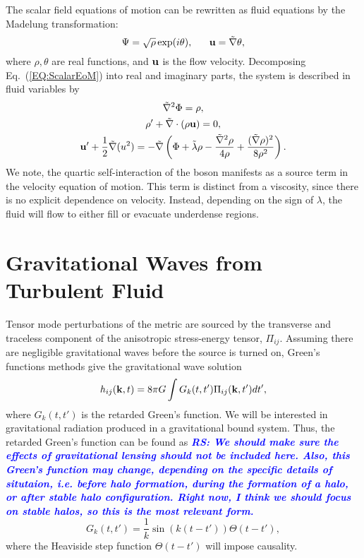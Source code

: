 \documentclass[onecolumn,nofootinbib,superscriptaddress]{revtex4}
\newcommand{\rs}[1]{\textcolor{blue}{\it{\textbf{RS: #1}}} }
\begin{document}
The scalar field equations of motion can be rewritten as fluid equations by the Madelung transformation:
\begin{equation}
\Psi = \sqrt{\rho}\exp(i\theta), \;\;\;\;\;\; {\bf{u}} = \tilde{\nabla}\theta,
\end{equation}
where $\rho, \theta$ are real functions, and ${\bf{u}}$ is the flow velocity.  Decomposing Eq.~(\ref{EQ:ScalarEoM}) into real and imaginary parts, the system is described in fluid variables by
\begin{gather}
\tilde{\nabla}^2\Phi = \rho,\\
\rho' + \tilde{\nabla}\cdot(\rho {\bf{u}}) = 0,\\
{\bf{u}}' + \frac{1}{2}\tilde{\nabla}(u^2) = -\tilde{\nabla}\left(\Phi + \tilde{\lambda}\rho - \frac{\tilde{\nabla}^2\rho}{4\rho}+\frac{(\tilde{\nabla}\rho)^2}{8\rho^2}\right).
\end{gather}
We note, the quartic self-interaction of the boson manifests as a source term in the velocity equation of motion.  This term is distinct from a viscosity, since there is no explicit dependence on velocity.  Instead, depending on the sign of $\lambda$, the fluid will flow to either fill or evacuate underdense regions.





\section{Gravitational Waves from Turbulent Fluid}

Tensor mode perturbations of the metric are sourced by the transverse and traceless component of the anisotropic stress-energy tensor, $\Pi_{ij}$. Assuming there are negligible gravitational waves before the source is turned on, Green's functions methods give the gravitational wave solution
\begin{equation}
h_{ij}({\bf{k}},t) = 8\pi G\int G_k(t,t')\Pi_{ij}({\bf{k}},t') dt',
\end{equation}
where $G_k(t,t')$ is the retarded Green's function.  We will be interested in gravitational radiation produced in a gravitational bound system.  Thus, the retarded Green's function can be found  as {\rs{We should make sure the effects of gravitational lensing should not be included here.  Also, this Green's function may change, depending on the specific details of situtaion, i.e. before halo formation, during the formation of a halo, or after stable halo configuration.  Right now, I think we should focus on stable halos, so this is the most relevant form.}}
\begin{equation}
G_k(t,t') = \frac{1}{k}\sin\left(k(t-t')\right)\Theta(t-t'),
\end{equation}
where the Heaviside step function $\Theta(t-t')$ will impose causality.
\end{document}
